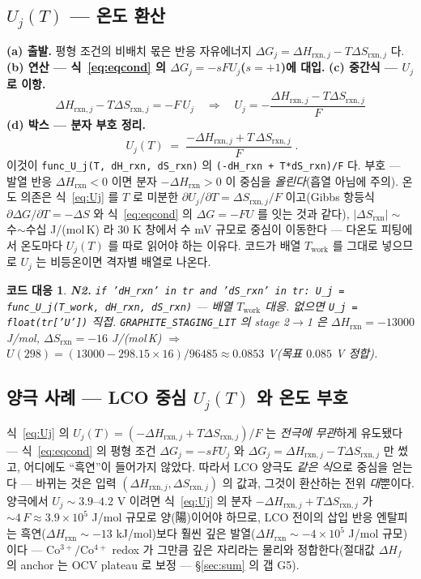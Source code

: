 \documentclass[11pt,a4paper]{article}
\newtheorem*{codebox}{코드 대응}
\newcommand{\rxn}{\mathrm{rxn}}
\newcommand{\work}{\mathrm{work}}
\newcommand{\code}[1]{\texttt{#1}}
\begin{document}
\subsection{$U_j(T)$ — 온도 환산}
\textbf{(a) 출발.} 평형 조건의 비배치 몫은 반응 자유에너지 $\Delta G_j=\Delta H_{\rxn,j}-T\Delta S_{\rxn,j}$ 다.
\textbf{(b) 연산 — 식~\eqref{eq:eqcond} 의 $\Delta G_j=-sFU_j$($s=+1$)에 대입.} \textbf{(c) 중간식 — $U_j$ 로 이항.}
\begin{equation}
\Delta H_{\rxn,j}-T\Delta S_{\rxn,j}=-F\,U_j
\quad\Longrightarrow\quad
U_j=-\frac{\Delta H_{\rxn,j}-T\Delta S_{\rxn,j}}{F}
\label{eq:Ujmid}
\end{equation}
\textbf{(d) 박스 — 분자 부호 정리.}
\begin{equation}
\boxed{\;U_j(T)\;=\;\frac{-\Delta H_{\rxn,j}+T\,\Delta S_{\rxn,j}}{F}\;.}
\label{eq:Uj}
\end{equation}
이것이 \code{func\_U\_j(T, dH\_rxn, dS\_rxn)} 의 \code{(-dH\_rxn + T*dS\_rxn)/F} 다. 부호 — 발열 반응
$\Delta H_\rxn<0$ 이면 분자 $-\Delta H_\rxn>0$ 이 중심을 \emph{올린다}(흡열 아님에 주의). 온도 의존은 식~\eqref{eq:Uj} 를
$T$ 로 미분한 $\partial U_j/\partial T=\Delta S_{\rxn,j}/F$ 이고(Gibbs 항등식 $\partial\Delta G/\partial T=-\Delta S$ 와
식~\eqref{eq:eqcond} 의 $\Delta G=-FU$ 를 잇는 것과 같다), $|\Delta S_\rxn|\sim$ 수$\sim$수십 J/(mol\,K) 라 $30$ K
창에서 수 mV 규모로 중심이 이동한다 — 다온도 피팅에서 온도마다 $U_j(T)$ 를 따로 읽어야 하는 이유다. 코드가 배열
$T_\work$ 를 그대로 넣으므로 $U_j$ 는 비등온이면 격자별 배열로 나온다.

\begin{codebox}
\textbf{N2.} \code{if 'dH\_rxn' in tr and 'dS\_rxn' in tr: U\_j = func\_U\_j(T\_work, dH\_rxn, dS\_rxn)}
— 배열 $T_\work$ 대응. 없으면 \code{U\_j = float(tr['U'])} 직접. \code{GRAPHITE\_STAGING\_LIT} 의 stage 2$\to$1 은
$\Delta H_\rxn=-13000$ J/mol, $\Delta S_\rxn=-16$ J/(mol\,K) $\Rightarrow$ $U(298)=(13000-298.15\times16)/96485
\approx0.0853$ V(목표 $0.085$ V 정합).
\end{codebox}

\subsection{양극 사례 — LCO 중심 $U_j(T)$ 와 온도 부호}\label{sub:lcocenter}
식~\eqref{eq:Uj} 의 $U_j(T)=(-\Delta H_{\rxn,j}+T\Delta S_{\rxn,j})/F$ 는 \emph{전극에 무관}하게 유도됐다 — 식~\eqref{eq:eqcond}
의 평형 조건 $\Delta G_j=-sFU_j$ 와 $\Delta G_j=\Delta H_{\rxn,j}-T\Delta S_{\rxn,j}$ 만 썼고, 어디에도 ``흑연''이 들어가지
않았다. 따라서 LCO 양극도 \emph{같은 식}으로 중심을 얻는다 — 바뀌는 것은 입력 $(\Delta H_{\rxn,j},\Delta S_{\rxn,j})$ 의
값과, 그것이 환산하는 전위 \emph{대}뿐이다. 양극에서 $U_j\sim3.9$--$4.2$ V 이려면 식~\eqref{eq:Uj} 의 분자
$-\Delta H_{\rxn,j}+T\Delta S_{\rxn,j}$ 가 $\sim4\,F\approx3.9\times10^5$ J/mol 규모로 양(陽)이어야 하므로, LCO 전이의
삽입 반응 엔탈피는 흑연($\Delta H_\rxn\sim-13$ kJ/mol)보다 훨씬 깊은 발열($\Delta H_\rxn\sim-4\times10^5$ J/mol 규모)이다
— Co$^{3+}/$Co$^{4+}$ redox 가 그만큼 깊은 자리라는 물리와 정합한다(절대값 $\Delta H_f$ 의 anchor 는 OCV plateau 로
보정 — \S\ref{sec:sum} 의 갭 G5).
\end{document}

